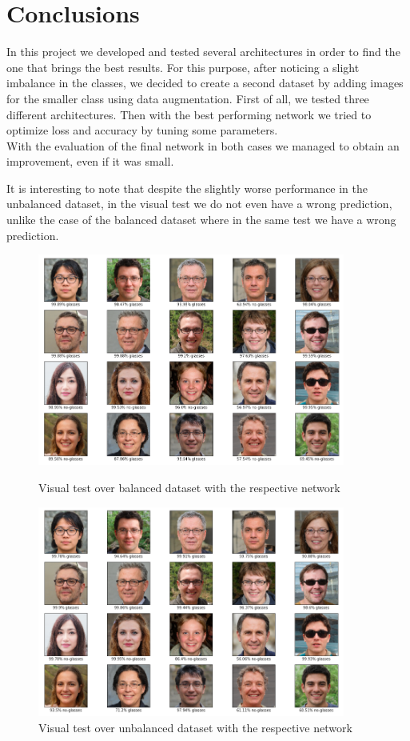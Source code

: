 \documentclass{article}
\begin{document}
\section{Conclusions}
In this project we developed and tested several architectures in order to find the one that brings the best results. For this purpose, after noticing a slight imbalance in the classes, we decided to create a second dataset by adding images for the smaller class using data augmentation. First of all, we tested three different architectures. Then with the best performing network we tried to optimize loss and accuracy by tuning some parameters.\\
With the evaluation of the final network in both cases we managed to obtain an improvement, even if it was small.

It is interesting to note that despite the slightly worse performance in the unbalanced dataset, in the visual test we do not even have a wrong prediction, unlike the case of the balanced dataset where in the same test we have a wrong prediction.


\newpage

\begin{figure}[h]
    \centering
    \includegraphics[width=0.9\textwidth]{images/test_unb.png}
    \caption{Visual test over balanced dataset with the respective network}
    \label{fig:test_unb}
\vspace{1cm}
    \centering
    \includegraphics[width=0.9\textwidth]{images/test_bal.png}
    \caption{Visual test over unbalanced dataset with the respective network}
    \label{fig:test_bal}
\end{figure}
\end{document}
